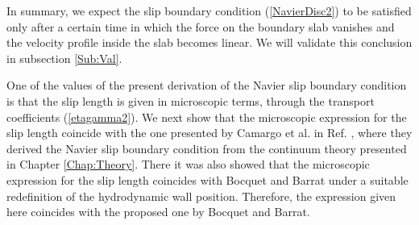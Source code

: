 \documentclass[b5paper,openright,10pt]{book}
\begin{document}
In summary, we expect  the slip boundary condition (\ref{NavierDisc2})
to be satisfied  only after a certain  time in which the  force on the
boundary  slab  vanishes and  the  velocity  profile inside  the  slab
becomes  linear.  We  will  validate  this  conclusion  in  subsection
\ref{Sub:Val}.


One  of the  values  of  the present  derivation  of  the Navier  slip
boundary condition  is that  the slip length  is given  in microscopic
terms, through the transport  coefficients (\ref{etagamma2}).  We next
show that the microscopic expression for the slip length coincide with
the one presented by Camargo et al. in  Ref.  \cite{CamargoBC2018}, where they derived the Navier
slip  boundary  condition  from  the  continuum  theory  presented  in
Chapter \ref{Chap:Theory}.   There it was  also   showed  that   the  microscopic
expression  for the  slip length  coincides with  Bocquet and Barrat under  a suitable
redefinition of the hydrodynamic wall position. Therefore, the expression given
here coincides with the proposed one by Bocquet and Barrat.
\end{document}
